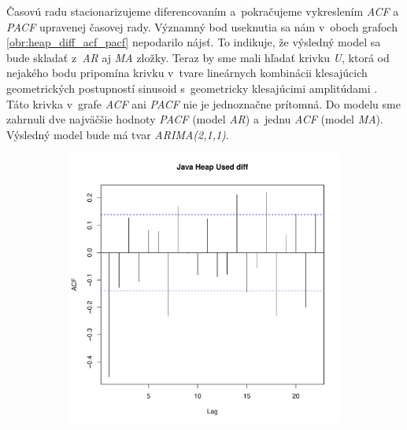 \documentclass[12pt,a4paper,oneside,final]{article}
\theoremstyle{definition}
\theoremstyle{remark}
\numberwithin{equation}{section}
\begin{document}
Časovú radu stacionarizujeme diferencovaním a~pokračujeme vykreslením \emph{ACF} a
\emph{PACF} upravenej časovej rady. 
Významný bod useknutia sa nám v~oboch grafoch \ref{obr:heap_diff_acf_pacf} nepodarilo nájsť. 
To indikuje, že výsledný 
model sa bude skladať z~\emph{AR} aj \emph{MA} zložky. Teraz by sme mali hľadať krivku 
\emph{U}, ktorá od nejakého bodu pripomína krivku v~tvare lineárnych kombinácii klesajúcich
geometrických postupností sinusoid s~geometricky klesajúcimi amplitúdami \cite{cipra}.
Táto krivka v~grafe \emph{ACF} ani \emph{PACF} nie je jednoznačne prítomná. Do modelu sme zahrnuli dve najväčšie 
hodnoty \emph{PACF} (model \emph{AR}) a~jednu \emph{ACF} (model \emph{MA}).
Výsledný model bude má tvar \emph{ARIMA(2,1,1)}.

\begin{figure}[H] \centering
    \begin{subfigure}[b]{0.45\textwidth}
        \centering
        \includegraphics[width=1\linewidth]{images/heap_diff_acf.pdf}
    \end{subfigure}
    \begin{subfigure}[b]{0.45\textwidth}
        \centering

\end{subfigure}
\end{figure}
\end{document}
